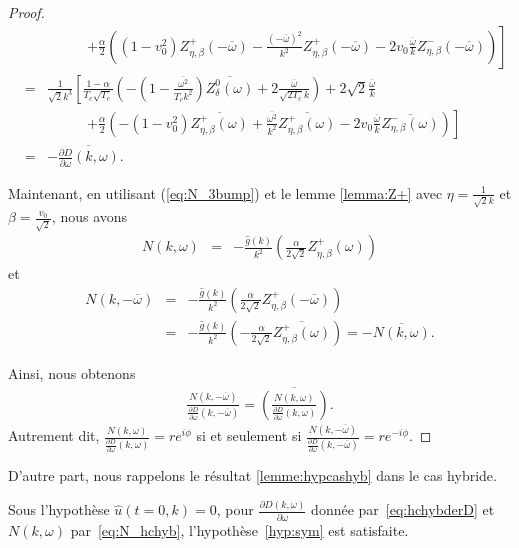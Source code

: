 \begin{proof}
\begin{eqnarray*}
&&~~~~~~~~~~~~~\left.+\frac{\alpha}{2}\left((1-v_0^2)Z_{\eta,\beta}^+\left(-\overline{\omega}\right)-\frac{(-\overline{\omega})^2}{k^2}Z_{\eta,\beta}^+\left(-\overline{\omega}\right)-2v_0\frac{\overline{\omega}}{k}Z_{\eta,\beta}^-\left(-\overline{\omega}\right)\right)\right]\\
&=&\frac{1}{\sqrt{2}k^3}\left[\frac{1-\alpha}{T_c\sqrt{T_c}}\left(-\left(1-\frac{\overline{\omega^2}}{T_ck^2}\right)\overline{Z_\delta^0\left(\omega\right)}+2\frac{\overline{\omega}}{\sqrt{2T_c}k}\right)+2\sqrt{2}\frac{\overline{\omega}}{k}\right.\nonumber\\
&&~~~~~~~~~~~~~\left.+\frac{\alpha}{2}\left(-(1-v_0^2)\overline{Z_{\eta,\beta}^+\left(\omega\right)}+\frac{\overline{\omega^2}}{k^2}\overline{Z_{\eta,\beta}^+\left(\omega\right)}-2v_0\frac{\overline{\omega}}{k}\overline{Z_{\eta,\beta}^-\left(\omega\right)}\right)\right]\nonumber\\
&=&-\overline{\frac{\partial D}{\partial \omega}(k,\omega)}.
\end{eqnarray*}

Maintenant, en utilisant (\ref{eq:N_3bump}) et le lemme \ref{lemma:Z+} avec $\eta=\frac{1}{\sqrt{2}k}$ et $\beta=\frac{v_0}{\sqrt{2}}$, nous avons
\begin{eqnarray*}
N(k,\omega)&=&-\frac{\hat{g}(k)}{k^2}\left(\frac{\alpha}{2\sqrt{2}}Z_{\eta,\beta}^+\left(\omega\right)\right)
\end{eqnarray*}
et
\begin{eqnarray*}
N(k,-\overline{\omega})&=&-\frac{\hat{g}(k)}{k^2}\left(\frac{\alpha}{2\sqrt{2}}Z_{\eta,\beta}^+\left(-\overline{\omega}\right)\right)\\
&=&-\frac{\hat{g}(k)}{k^2}\left(-\frac{\alpha}{2\sqrt{2}}\overline{Z_{\eta,\beta}^+\left(\omega\right)}\right)=-\overline{N(k,\omega)}.
\end{eqnarray*}

Ainsi, nous obtenons 
\begin{eqnarray*}
\frac{N(k,-\overline{\omega})}{\frac{\partial D}{\partial \omega}(k,-\overline{\omega})}=\overline{\left(\frac{N(k,\omega)}{\frac{\partial D}{\partial \omega}(k,\omega)}\right)}.
\end{eqnarray*}
Autrement dit, $\frac{N(k,\omega)}{\frac{\partial D}{\partial \omega}(k,\omega)}=re^{i\phi}$ si et seulement si $\frac{N(k,-\overline{\omega})}{\frac{\partial D}{\partial \omega}(k,-\overline{\omega})}=re^{-i\phi}$.
\end{proof}

D'autre part, nous rappelons le résultat \ref{lemme:hypcashyb} dans le cas hybride.
\begin{lemma}
  Sous l'hypothèse $\hat{u}(t=0,k)=0$, pour $\frac{\partial D(k,\omega)}{\partial\omega}$ donnée par~\eqref{eq:hchybderD} et $N(k,\omega)$ par~\eqref{eq:N_hchyb}, l'hypothèse~\ref{hyp:sym} est satisfaite.
\end{lemma}

